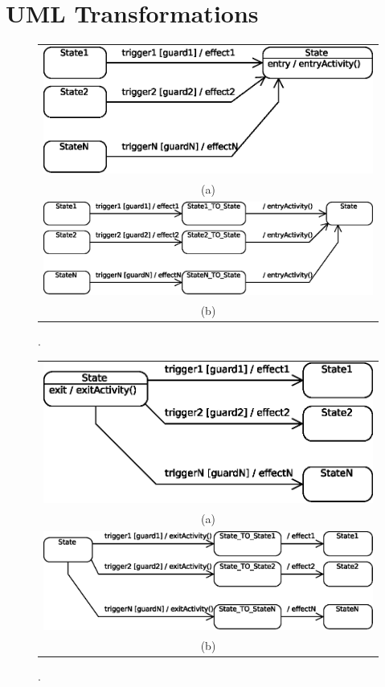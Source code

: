 \section{UML Transformations}
\label{sec:umltransformations}


\begin{figure}
\centering
  \begin{tabular}{c}
  \includegraphics[width=0.7\columnwidth]{images/entryActionsBEFORE}\\ 
(a)\\
  \includegraphics[width=0.85\columnwidth]{images/entryActionsAFTER}\\
(b)
  \end{tabular}
  \caption{.}
  \label{fig:}
\end{figure}


\begin{figure}
\centering
  \begin{tabular}{c}
  \includegraphics[width=0.7\columnwidth]{images/exitActionsBEFORE}\\ 
(a)\\
  \includegraphics[width=0.85\columnwidth]{images/exitActionsAFTER}\\
(b)
  \end{tabular}
  \caption{.}
  \label{fig:}
\end{figure}


